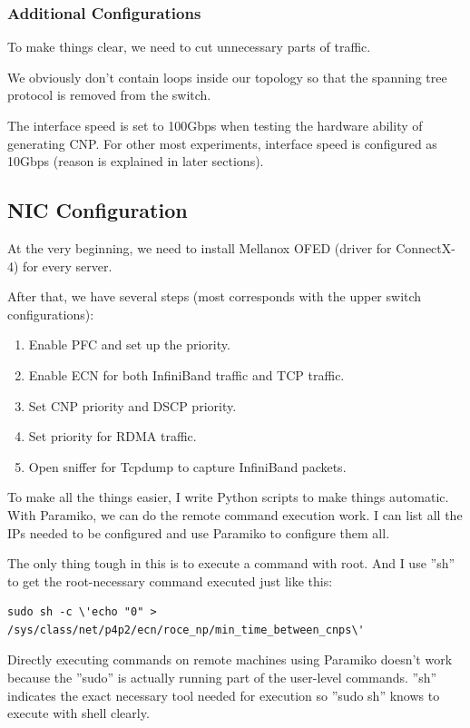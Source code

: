 \documentclass[12pt,a4paper]{article}
\begin{document}
\subsubsection{Additional Configurations}
To make things clear, we need to cut unnecessary parts of traffic.

We obviously don't contain loops inside our topology so that the spanning tree protocol is removed from the switch.

The interface speed is set to 100Gbps when testing the hardware ability of generating CNP.
For other most experiments, interface speed is configured as 10Gbps (reason is explained in later sections).

\subsection{NIC Configuration}
At the very beginning, we need to install Mellanox OFED (driver for ConnectX-4) for every server.

After that, we have several steps (most corresponds with the upper switch configurations):
\begin{enumerate}
	\item Enable PFC and set up the priority.
	\item Enable ECN for both InfiniBand traffic and TCP traffic.
	\item Set CNP priority and DSCP priority.
	\item Set priority for RDMA traffic.
	\item Open sniffer for Tcpdump \cite{Tcpdump} to capture InfiniBand packets.
\end{enumerate}

To make all the things easier, I write Python scripts to make things automatic.
With Paramiko, we can do the remote command execution work.
I can list all the IPs needed to be configured and use Paramiko to configure them all.

The only thing tough in this is to execute a command with root.
And I use ''sh'' to get the root-necessary command executed just like this:
\begin{lstlisting}
sudo sh -c \'echo "0" > /sys/class/net/p4p2/ecn/roce_np/min_time_between_cnps\'
\end{lstlisting}

Directly executing commands on remote machines using Paramiko doesn't work because the ''sudo'' is actually running part of
the user-level commands.
''sh'' indicates the exact necessary tool needed for execution so ''sudo sh'' knows to execute with shell clearly.
\end{document}
